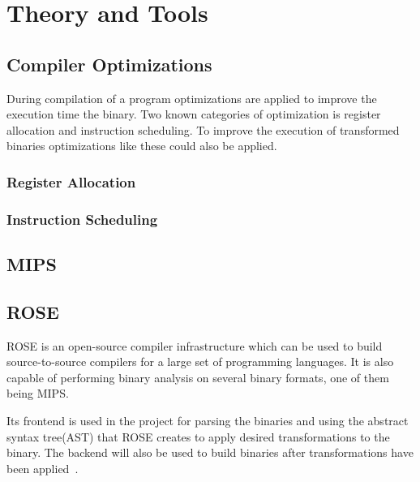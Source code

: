 \chapter{Theory and Tools}


\section{Compiler Optimizations}
During compilation of a program optimizations are applied
to improve the execution time the binary. Two known categories
of optimization is register allocation and instruction scheduling.
To improve the execution of transformed binaries optimizations
like these could also be applied.

\subsection{Register Allocation}


\subsection{Instruction Scheduling}


\section{MIPS}

\section{ROSE}
ROSE is an open-source compiler infrastructure which can be used to build
source-to-source compilers for a large set of programming languages.
It is also capable of performing binary analysis on several
binary formats, one of them being MIPS.
%

Its frontend is used in the project for parsing the binaries and using
the abstract syntax tree(AST) that ROSE creates to apply desired
transformations to the binary. The backend will also be used to build
binaries after transformations have been applied~\cite{rose}.

